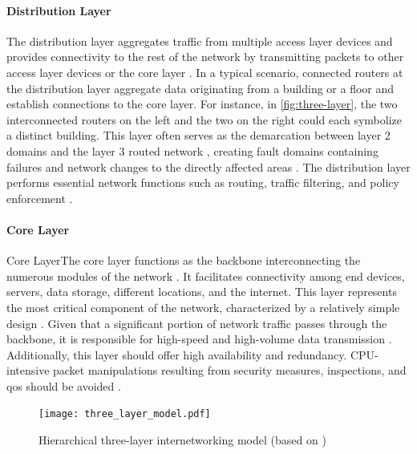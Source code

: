 \paragraph{Distribution Layer} %
\label{par:Distribution Layer}
The distribution layer aggregates traffic from multiple access layer devices
    and provides connectivity to the rest of the network by transmitting
    packets to other access layer devices or the core layer
    \cite{cisco_campus_net}.
In a typical scenario, connected routers at the distribution layer aggregate
    data originating from a building or a floor and establish connections to
    the core layer.
For instance, in \autoref{fig:three-layer}, the two interconnected routers on
    the left and the two on the right could each symbolize a distinct building.
This layer often serves as the demarcation between layer 2 domains and the
    layer 3 routed network \cite{cisco_net_size}, creating fault domains
    containing failures and network changes to the directly affected areas
    \cite{cisco_design_guide}.
The distribution layer performs essential network functions such as routing,
    traffic filtering, and policy enforcement \cite{cisco_campus_net}.


\paragraph{Core Layer} %
\label{par:Core Layer}
Core LayerThe core layer functions as the backbone interconnecting the numerous modules
    of the network \cite{cisco_campus_net}.
It facilitates connectivity among end devices, servers, data storage, different
    locations, and the internet.
This layer represents the most critical component of the network, characterized
    by a relatively simple design \cite{cisco_design_guide}.
Given that a significant portion of network traffic passes through the
    backbone, it is responsible for high-speed and high-volume data
    transmission \cite{cisco_campus_net}.
Additionally, this layer should offer high availability and redundancy.
CPU-intensive packet manipulations resulting from security measures,
    inspections, and \gls{qos} should be avoided \cite{cisco_campus_net}.


\begin{figure}
    \begin{center}
        \texttt{[image: three\_layer\_model.pdf]}
    \end{center}
    \caption{Hierarchical three-layer internetworking model (based on
    \cite{cisco_3_tier})}
    \label{fig:three-layer}
\end{figure}


